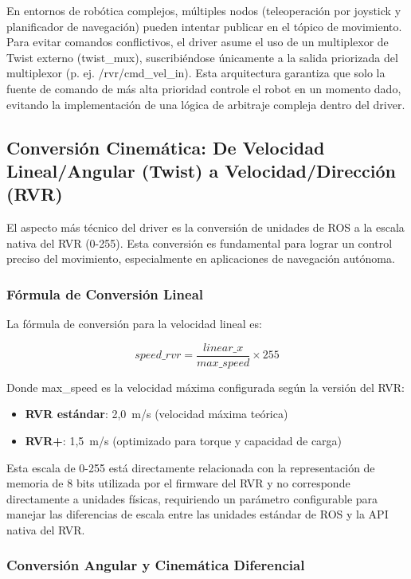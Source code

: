 \documentclass[11pt]{article}
\newcommand{\code}[1]{\textcolor{codeblue}{\url{#1}}}
\numberwithin{figure}{section}
\numberwithin{table}{section}
\def\code#1{#1}%
\begin{document}
En entornos de robótica complejos, múltiples nodos (teleoperación por joystick y planificador de navegación) pueden intentar publicar en el tópico de movimiento. Para evitar comandos conflictivos, el driver asume el uso de un multiplexor de Twist externo (\code{twist\_mux}), suscribiéndose únicamente a la salida priorizada del multiplexor (p. ej. \code{/rvr/cmd\_vel\_in}). Esta arquitectura garantiza que solo la fuente de comando de más alta prioridad controle el robot en un momento dado, evitando la implementación de una lógica de arbitraje compleja dentro del driver.


\subsection{Conversión Cinemática: De Velocidad Lineal/Angular (Twist) a Velocidad/Dirección (RVR)}

El aspecto más técnico del driver es la conversión de unidades de ROS a la escala nativa del RVR (0-255). Esta conversión es fundamental para lograr un control preciso del movimiento, especialmente en aplicaciones de navegación autónoma.


\subsubsection{Fórmula de Conversión Lineal}

La fórmula de conversión para la velocidad lineal es:

$$speed\_rvr = \frac{linear\_x}{max\_speed} \times 255$$

Donde \code{max\_speed} es la velocidad máxima configurada según la versión del RVR:

\begin{itemize}
    \item \textbf{RVR estándar}: 2,0~m/s (velocidad máxima teórica)
    \item \textbf{RVR+}: 1,5~m/s (optimizado para torque y capacidad de carga)
\end{itemize}

Esta escala de 0-255 está directamente relacionada con la representación de memoria de 8 bits utilizada por el firmware del RVR y no corresponde directamente a unidades físicas, requiriendo un parámetro configurable para manejar las diferencias de escala entre las unidades estándar de ROS y la API nativa del RVR.


\subsubsection{Conversión Angular y Cinemática Diferencial}
\end{document}
